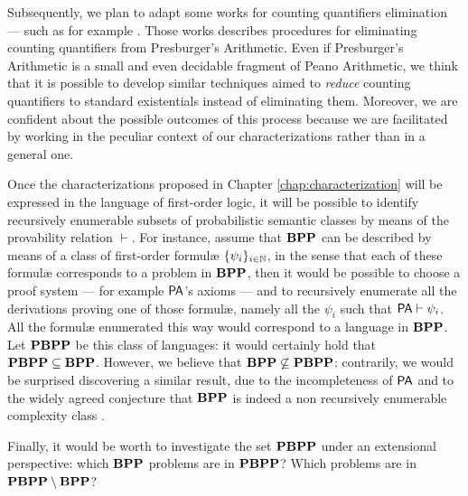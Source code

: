 Subsequently, we plan to adapt some works for counting quantifiers elimination
--- such as for example \cite{Schweikardt, Chistikov2021PresburgerAW}.
Those works describes procedures for eliminating counting quantifiers from
Presburger's Arithmetic. Even if Presburger's Arithmetic is a small
and even decidable fragment of Peano Arithmetic, we think that
it is possible to develop similar techniques
aimed to \emph{reduce} counting quantifiers to standard existentials
instead of eliminating them. Moreover, we are confident about the possible
outcomes of this process because we are facilitated by working in
the peculiar context of our characterizations
rather than in a general one.

Once the characterizations proposed in Chapter \ref{chap:characterization}
will be expressed in the language of first-order logic, it will be possible
to identify recursively enumerable subsets of probabilistic semantic classes by means of
the provability relation $\vdash$. For instance, assume that $\mathbf{BPP}$ can be described
by means of a class of first-order formul\ae{} $\{\psi_i\}_{i \in \mathbb{N}}$,
in the sense that each of these formul\ae{} corresponds to a problem in $\mathbf{BPP}$,
then it would be possible to choose a proof system --- for example $\mathsf{PA}$'s axioms ---
and to recursively enumerate all the derivations proving one
of those formul\ae{}, namely all the $\psi_i$ such that $\mathsf{PA} \vdash \psi_i$.
All the formul\ae{} enumerated this way would correspond
to a language in $\mathbf{BPP}$. Let $\mathbf{PBPP}$ be this class of languages:
it would certainly hold that $\mathbf{PBPP}\subseteq \mathbf{BPP}$. However,
we believe that $\mathbf{BPP} \not \subseteq \mathbf{PBPP}$:
contrarily, we would be surprised discovering a similar result, due to the
incompleteness of $\mathsf{PA}$ and to the widely agreed
conjecture that $\mathbf{BPP}$ is indeed a non recursively enumerable complexity class \cite{AroraBarak}.

Finally, it would be worth to investigate the set $\mathbf{PBPP}$ under an
extensional perspective: which $\mathbf{BPP}$
problems are in $\mathbf{PBPP}$? Which problems are in $\mathbf{PBPP} \setminus \mathbf{BPP}$?
